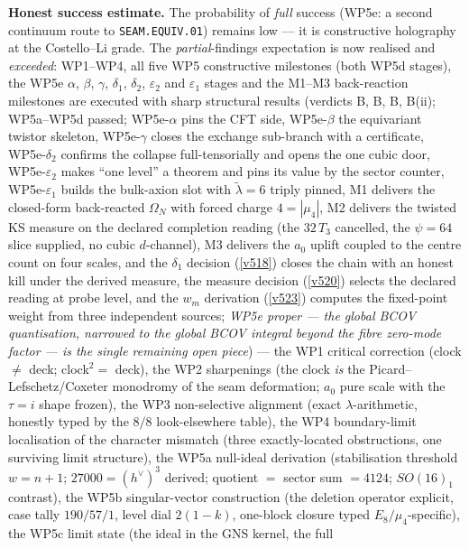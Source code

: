 \documentclass[11pt,a4paper]{article}
\begin{document}
\par\smallskip\noindent\textbf{Honest success estimate.} The probability of \emph{full} success
(WP5e: a second continuum route to \texttt{SEAM.EQUIV.01}) remains low --- it is constructive
holography at the Costello--Li grade. The \emph{partial}-findings expectation is now realised and
\emph{exceeded}: WP1--WP4, all five WP5 constructive milestones (both WP5d stages), the WP5e
$\alpha$, $\beta$, $\gamma$, $\delta_1$, $\delta_2$, $\varepsilon_2$ and $\varepsilon_1$ stages
and the
M1--M3 back-reaction milestones are
executed with sharp structural results (verdicts B, B, B, B(ii); WP5a--WP5d passed;
WP5e-$\alpha$ pins the CFT side, WP5e-$\beta$ the equivariant twistor skeleton, WP5e-$\gamma$
closes the exchange sub-branch with a certificate, WP5e-$\delta_2$ confirms the collapse
full-tensorially and opens the one cubic door, WP5e-$\varepsilon_2$ makes ``one level'' a
theorem and pins its value by the sector counter, WP5e-$\varepsilon_1$ builds the bulk-axion
slot with $\tilde\lambda=6$ triply pinned, M1 delivers the closed-form back-reacted
$\Omega_N$ with forced charge $4=|\mu_4|$, M2 delivers the twisted KS measure on the declared
completion reading (the $32\,T_3$ cancelled, the $\psi=64$ slice supplied, no cubic
$d$-channel), M3 delivers the $a_0$ uplift coupled to the centre count on four scales, and the
$\delta_1$ decision (\vref{v518}) closes the chain with an honest kill under the derived
measure, the measure decision (\vref{v520}) selects the declared reading at probe level, and
the $w_m$ derivation (\vref{v523}) computes the fixed-point weight from three independent
sources;
\emph{WP5e proper
--- the global BCOV quantisation, narrowed to the global BCOV integral beyond the fibre
zero-mode factor ---
is the single remaining open piece}) --- the WP1 critical correction (clock $\neq$ deck; clock$^2=$ deck),
the WP2 sharpenings (the clock \emph{is} the Picard--Lefschetz/Coxeter monodromy of the seam
deformation; $a_0$ pure scale with the $\tau{=}i$ shape frozen), the WP3 non-selective alignment (exact
$\lambda$-arithmetic, honestly typed by the $8/8$ look-elsewhere table), the WP4 boundary-limit
localisation of the character mismatch (three exactly-located obstructions, one surviving limit
structure), the WP5a null-ideal derivation (stabilisation threshold $w=n{+}1$; $27000=(h^\vee)^3$
derived; quotient $=$ sector sum $=4124$; $SO(16)_1$ contrast), the WP5b singular-vector
construction (the deletion operator explicit, case tally $190/57/1$, level dial $2(1{-}k)$, one-block
closure typed $E_8/\mu_4$-specific), the WP5c limit state (the ideal in the GNS kernel, the full
\end{document}
